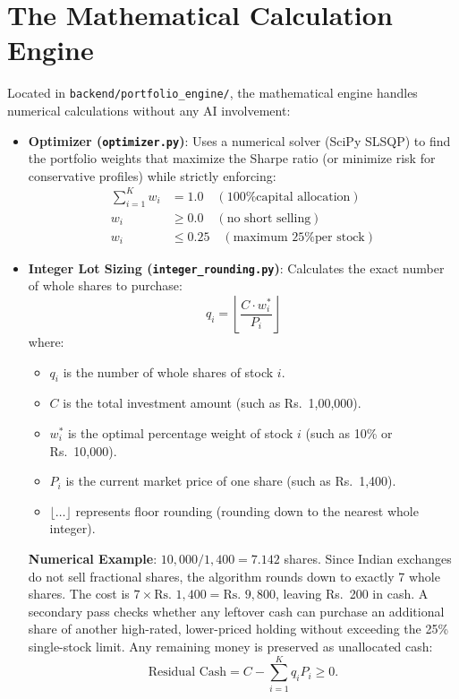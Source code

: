 \section{The Mathematical Calculation Engine}
Located in \texttt{backend/portfolio\_engine/}, the mathematical engine handles numerical calculations without any AI involvement:
\begin{itemize}
    \item \textbf{Optimizer (\texttt{optimizer.py})}: Uses a numerical solver (SciPy SLSQP) to find the portfolio weights that maximize the Sharpe ratio (or minimize risk for conservative profiles) while strictly enforcing:
    \begin{align*}
    \sum_{i=1}^{K} w_i &= 1.0 \quad (\text{100\% capital allocation}) \\
    w_i &\ge 0.0 \quad (\text{no short selling}) \\
    w_i &\le 0.25 \quad (\text{maximum 25\% per stock})
    \end{align*}
    \item \textbf{Integer Lot Sizing (\texttt{integer\_rounding.py})}: Calculates the exact number of whole shares to purchase:
    \begin{equation}
    q_i = \left\lfloor \frac{C \cdot w_i^*}{P_i} \right\rfloor
    \end{equation}
    where:
    \begin{itemize}
        \item $q_i$ is the number of whole shares of stock $i$.
        \item $C$ is the total investment amount (such as Rs.~1,00,000).
        \item $w_i^*$ is the optimal percentage weight of stock $i$ (such as 10\% or Rs.~10,000).
        \item $P_i$ is the current market price of one share (such as Rs.~1,400).
        \item $\lfloor \dots \rfloor$ represents floor rounding (rounding down to the nearest whole integer).
    \end{itemize}

    \textbf{Numerical Example}: $10,000 / 1,400 = 7.142$ shares. Since Indian exchanges do not sell fractional shares, the algorithm rounds down to exactly 7 whole shares. The cost is $7 \times \text{Rs.~}1,400 = \text{Rs.~}9,800$, leaving Rs.~200 in cash. A secondary pass checks whether any leftover cash can purchase an additional share of another high-rated, lower-priced holding without exceeding the 25\% single-stock limit. Any remaining money is preserved as unallocated cash:
    \begin{equation}
    \text{Residual Cash} = C - \sum_{i=1}^{K} q_i P_i \ge 0.
    \end{equation}


\end{itemize}
